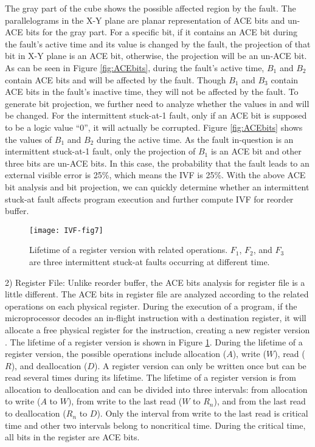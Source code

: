The gray part of the cube shows the possible affected region by the fault. The parallelograms in the X-Y plane are planar representation of ACE bits and un-ACE bits for the gray part. For a specific bit, if it contains an ACE bit during the fault’s active time and its value is changed by the fault, the projection of that bit in X-Y plane is an ACE bit, otherwise, the projection will be an un-ACE bit. As can be seen in Figure \ref{fig:ACEbits}, during the fault’s active time, $B_1$ and $B_2$ contain ACE bits and will be affected by the fault. Though $B_1$ and $B_3$ contain ACE bits in the fault’s inactive time, they will not be affected by the fault. To generate bit projection, we further need to analyze whether the values in and will be changed. For the intermittent stuck-at-1 fault, only if an ACE bit is supposed to be a logic value “0”, it will actually be corrupted. Figure \ref{fig:ACEbits} shows the values of $B_1$ and $B_2$ during the active time. As the fault in-question is an intermittent stuck-at-1 fault, only the projection of $B_1$ is an ACE bit and other three bits are un-ACE bits. In this case, the probability that the fault leads to an external visible error is 25\%, which means the IVF is 25\%. With the above ACE bit analysis and bit projection, we can quickly determine whether an intermittent stuck-at fault affects program execution and further compute IVF for reorder buffer.

\begin{figure}[t]
    \centering
    \texttt{[image: IVF-fig7]}\\
    \caption{Lifetime of a register version with related operations. $F_1$, $F_2$, and $F_3$ are three intermittent stuck-at faults occurring at different time.}
    \label{fig:register-lifetime}
\end{figure}


2) Register File: Unlike reorder buffer, the ACE bits analysis for register file is a little different. The ACE bits in register file are analyzed according to the related operations on each physical register. During the execution of a program, if the microprocessor decodes an in-flight instruction with a destination register, it will allocate a free physical register for the instruction, creating a new register version \cite{Using_Register_Lifetime_dsn07}. The lifetime of a register version is shown in Figure \ref{fig:register-lifetime}. During the lifetime of a register version, the possible operations include allocation ($A$), write ($W$), read ($R$), and deallocation ($D$). A register version can only be written once but can be read several times during its lifetime. The lifetime of a register version is from allocation to deallocation and can be divided into three intervals: from allocation to write ($A$ to $W$), from write to the last read ($W$ to $R_n$), and from the last read to deallocation ($R_n$ to $D$). Only the interval from write to the last read is critical time and other two intervals belong to noncritical time. During the critical time, all bits in the register are ACE bits.


